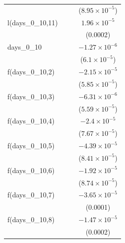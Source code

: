 \begin{tabular}{lccc}
                                    &          &                       & ($8.95\times 10^{-5}$)\\    
   l(days\_0\_10,11)                &          &                       & $1.96\times 10^{-5}$\\    
                                    &          &                       & (0.0002)\\   
   days\_0\_10                      &          &                       & $-1.27\times 10^{-6}$\\    
                                    &          &                       & ($6.1\times 10^{-5}$)\\    
   f(days\_0\_10,2)                 &          &                       & $-2.15\times 10^{-5}$\\    
                                    &          &                       & ($5.85\times 10^{-5}$)\\    
   f(days\_0\_10,3)                 &          &                       & $-6.31\times 10^{-6}$\\    
                                    &          &                       & ($5.59\times 10^{-5}$)\\    
   f(days\_0\_10,4)                 &          &                       & $-2.4\times 10^{-5}$\\    
                                    &          &                       & ($7.67\times 10^{-5}$)\\    
   f(days\_0\_10,5)                 &          &                       & $-4.39\times 10^{-5}$\\    
                                    &          &                       & ($8.41\times 10^{-5}$)\\    
   f(days\_0\_10,6)                 &          &                       & $-1.92\times 10^{-5}$\\    
                                    &          &                       & ($8.74\times 10^{-5}$)\\    
   f(days\_0\_10,7)                 &          &                       & $-3.65\times 10^{-5}$\\    
                                    &          &                       & (0.0001)\\   
   f(days\_0\_10,8)                 &          &                       & $-1.47\times 10^{-5}$\\    
                                    &          &                       & (0.0002)\\   

\end{tabular}
